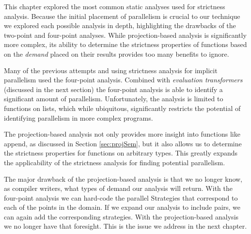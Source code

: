 This chapter explored the most common static analyses used for strictness
analysis.  Because the initial placement of parallelism is crucial to our
technique we explored each possible analysis in depth, highlighting the
drawbacks of the two-point and four-point analyses. While projection-based
analysis is significantly more complex, its ability to determine the strictness
properties of functions based on the \emph{demand} placed on their results
provides too many benefits to ignore.

Many of the previous attempts and using strictness analysis for implicit
parallelism used the four-point analysis. Combined with \emph{evaluation
transformers} (discussed in the next section) the four-point analysis is able
to identify a significant amount of parallelism. Unfortunately, the analysis is
limited to functions on lists, which while ubiquitous, significantly restricts
the potential of identifying parallelism in more complex programs.

The projection-based analysis not only provides more insight into functions
like \<append\>, as discussed in Section \ref{sec:projSem}, but it also allows
us to determine the strictness properties for functions on arbitrary types.
This greatly expands the applicability of the strictness analysis for finding
potential parallelism.

The major drawback of the projection-based analysis is that we no longer know,
as compiler writers, what types of demand our analysis will return. With the
four-point analysis we can hard-code the parallel Strategies that correspond to
each of the points in the domain. If we expand our analysis to include pairs,
we can again add the corresponding strategies. With the projection-based
analysis we no longer have that foresight. This is the issue we address in the
next chapter.
